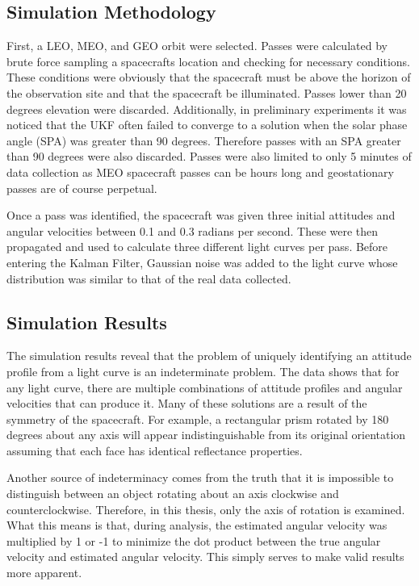 \subsection{Simulation Methodology}

First, a LEO, MEO, and GEO orbit were selected. Passes were calculated by brute force sampling a spacecrafts location and checking for necessary conditions. These conditions were obviously that the spacecraft must be above the horizon of the observation site and that the spacecraft be illuminated. Passes lower than 20 degrees elevation were discarded. Additionally, in preliminary experiments it was noticed that the UKF often failed to converge to a solution when the solar phase angle (SPA) was greater than 90 degrees. Therefore passes with an SPA greater than 90 degrees were also discarded. Passes were also limited to only 5 minutes of data collection as MEO spacecraft passes can be hours long and geostationary passes are of course perpetual.

Once a pass was identified, the spacecraft was given three initial attitudes and angular velocities between 0.1 and 0.3 radians per second. These were then propagated and used to calculate three different light curves per pass. Before entering the Kalman Filter, Gaussian noise was added to the light curve whose distribution was similar to that of the real data collected.
\subsection{Simulation Results}

The simulation results reveal that the problem of uniquely identifying an attitude profile from a light curve is an indeterminate problem. The data shows that for any light curve, there are multiple combinations of attitude profiles and angular velocities that can produce it. Many of these solutions are a result of the symmetry of the spacecraft. For example, a rectangular prism rotated by 180 degrees about any axis will appear indistinguishable from its original orientation assuming that each face has identical reflectance properties.

Another source of indeterminacy comes from the truth that it is impossible to distinguish between an object rotating about an axis clockwise and counterclockwise. Therefore, in this thesis, only the axis of rotation is examined. What this means is that, during analysis, the estimated angular velocity was multiplied by 1 or -1 to minimize the dot product between the true angular velocity and estimated angular velocity. This simply serves to make valid results more apparent.


